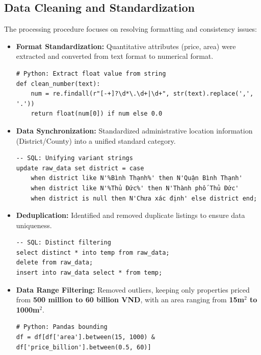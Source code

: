 \documentclass[12pt, a4paper]{article}
\begin{document}
\subsection{Data Cleaning and Standardization}
The processing procedure focuses on resolving formatting and consistency issues:
\begin{itemize}[noitemsep, topsep=0pt]
    \item \textbf{Format Standardization:} Quantitative attributes (price, area) were extracted and converted from text format to numerical format.
\vspace{-0.3em}
\begin{scriptsize}
\begin{verbatim}
# Python: Extract float value from string
def clean_number(text):
    num = re.findall(r"[-+]?\d*\.\d+|\d+", str(text).replace(',', '.'))
    return float(num[0]) if num else 0.0
\end{verbatim}
\end{scriptsize}

    \item \textbf{Data Synchronization:} Standardized administrative location information (District/County) into a unified standard category.
\vspace{-0.3em}
\begin{scriptsize}
\begin{verbatim}
-- SQL: Unifying variant strings
update raw_data set district = case
    when district like N'%Bình Thạnh%' then N'Quận Bình Thạnh'
    when district like N'%Thủ Đức%' then N'Thành phố Thủ Đức'
    when district is null then N'Chưa xác định' else district end;
\end{verbatim}
\end{scriptsize}

    \item \textbf{Deduplication:} Identified and removed duplicate listings to ensure data uniqueness.
\vspace{-0.3em}
\begin{scriptsize}
\begin{verbatim}
-- SQL: Distinct filtering
select distinct * into temp from raw_data;
delete from raw_data;
insert into raw_data select * from temp;
\end{verbatim}
\end{scriptsize}

    \item \textbf{Data Range Filtering:} Removed outliers, keeping only properties priced from \textbf{500 million to 60 billion VND}, with an area ranging from \textbf{15m$^2$ to 1000m$^2$}.
\vspace{-0.3em}
\begin{scriptsize}
\begin{verbatim}
# Python: Pandas bounding
df = df[df['area'].between(15, 1000) & df['price_billion'].between(0.5, 60)]
\end{verbatim}
\end{scriptsize}
\end{itemize}
\end{document}
